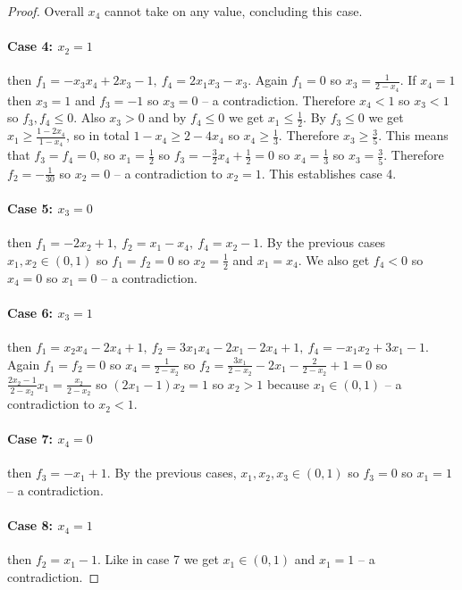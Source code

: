 \documentclass[preprint,12pt,authoryear]{elsarticle}
\begin{document}
\begin{proof}
  Overall $x_4$ cannot take on any value, concluding this case.

  \paragraph{Case 4: $x_2=1$} then $f_1=-x_3x_4+2x_3-1,~f_4=2x_1x_3-x_3$. Again $f_1=0$ so 
  $x_3=\frac{1}{2-x_4}$. If $x_4=1$ then $x_3=1$ and $f_3=-1$ so $x_3=0$ -- a 
  contradiction. Therefore $x_4<1$ so $x_3<1$ so $f_3,f_4\le0$.
  Also $x_3>0$ and by $f_4\le0$ we get $x_1\le\frac{1}{2}$.
  By $f_3\le0$ we get $x_1\ge\frac{1-2x_4}{1-x_4}$, so in total $1-x_4\ge2-4x_4$ so 
  $x_4\ge\frac{1}{3}$. Therefore $x_3\ge\frac{3}{5}$. This means that $f_3=f_4=0$, so 
  $x_1=\frac{1}{2}$ so $f_3=-\frac{3}{2}x_4+\frac{1}{2}=0$ so $x_4=\frac{1}{3}$ so 
  $x_3=\frac{3}{5}$. Therefore $f_2=-\frac{1}{30}$ so $x_2=0$ -- a contradiction to 
  $x_2=1$. This establishes case 4. 

  \paragraph{Case 5: $x_3=0$} then $f_1=-2x_2+1,~f_2=x_1-x_4,~f_4=x_2-1$. By the previous 
  cases $x_1,x_2\in(0,1)$ so $f_1=f_2=0$ so $x_2=\frac{1}{2}$ and $x_1=x_4$. We also get 
  $f_4<0$ so $x_4=0$ so $x_1=0$ -- a contradiction.

  \paragraph{Case 6: $x_3=1$} then 
  $f_1=x_2x_4-2x_4+1,~f_2=3x_1x_4-2x_1-2x_4+1,~f_4=-x_1x_2+3x_1-1$.
  Again $f_1=f_2=0$ so $x_4=\frac{1}{2-x_2}$ so 
  $f_2=\frac{3x_1}{2-x_2}-2x_1-\frac{2}{2-x_2}+1=0$ so 
  $\frac{2x_2-1}{2-x_2}x_1=\frac{x_2}{2-x_2}$ so $(2x_1-1)x_2=1$ so $x_2>1$ because 
  $x_1\in(0,1)$ -- a contradiction to $x_2<1$.

  \paragraph{Case 7: $x_4=0$} then $f_3=-x_1+1$. By the previous cases, 
  $x_1,x_2,x_3\in(0,1)$ so $f_3=0$ so $x_1=1$ -- a contradiction.

  \paragraph{Case 8: $x_4=1$} then $f_2=x_1-1$. Like in case 7 we get $x_1\in(0,1)$ and 
  $x_1=1$ -- a contradiction.
  

\end{proof}
\end{document}
